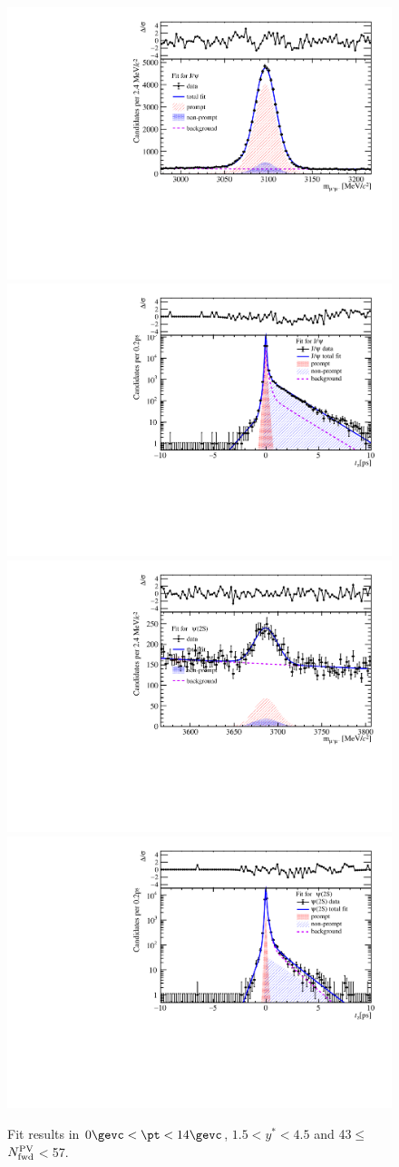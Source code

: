\begin{figure}[H]
\begin{center}
\includegraphics[width=0.45\linewidth]{pdf/Pbp/FWorkdir/TwoDimFit/ProjMass/Jpsi_n3y1pt1.pdf}
\includegraphics[width=0.45\linewidth]{pdf/Pbp/FWorkdir/TwoDimFit/ProjTz/Jpsi_n3y1pt1.pdf}
\vspace*{-0.5cm}
\includegraphics[width=0.45\linewidth]{pdf/Pbp/FWorkdir/TwoDimFit/ProjMass/Psi2S_n3y1pt1.pdf}
\includegraphics[width=0.45\linewidth]{pdf/Pbp/FWorkdir/TwoDimFit/ProjTz/Psi2S_n3y1pt1.pdf}
\vspace*{-0.5cm}
\end{center}
\caption{Fit results in $0\gevc<\pt<14\gevc$, $1.5<y^*<4.5$ and 43$\leq$$N_{\rm fwd}^{\rm PV}$$<$57.}
\end{figure}
